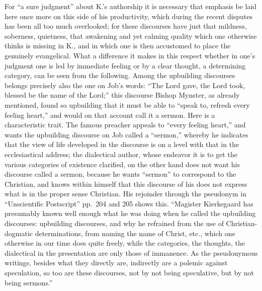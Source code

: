 \documentclass[12pt,a4paper]{article}
\newcommand{\opage}[1]{\marginnote{\footnotesize\textit{[#1]}}}
\begin{document}
For ``a sure judgment'' about K.'s authorship
it is necessary that emphasis be laid here once more on
this side of his productivity, which during the recent disputes has been all too much
overlooked; for these discourses have
just that mildness, soberness, quietness, that awakening and
yet calming quality which one otherwise thinks is missing in
K., and in which one is then accustomed to place the genuinely evangelical.
What a difference it makes in this respect whether
in one's judgment one is led by immediate feeling or by a
clear thought, a determining category, can be seen
from the following. Among the upbuilding discourses belongs precisely
also the one on Job's words: ``The Lord gave, the Lord took,
blessed be the name of the Lord;'' this discourse Bishop
Mynster, as already mentioned, found so upbuilding that it
must be able to ``speak to, refresh every feeling heart,''
and would on that account call it a sermon. Here
\opage{10}
is a characteristic trait. The famous preacher appeals
to ``every feeling heart,'' and wants the
upbuilding discourse on Job called a ``sermon,'' whereby
he indicates that the view of life developed in the discourse
is on a level with that in the ecclesiastical address;
the dialectical author, whose endeavor it is to get
the various categories of existence clarified, on the other hand
does not want his discourse called a sermon, because he
wants ``sermon'' to correspond to the Christian, and knows
within himself that this discourse of his does not express what is in
the proper sense Christian. His rejoinder through
the pseudonym in ``Unscientific Postscript'' pp.\ 204 and
205 shows this. ``Magister Kierkegaard has presumably known well enough
what he was doing when he called the upbuilding
discourses: upbuilding discourses, and why he refrained
from the use of Christian-dogmatic determinations, from
naming the name of Christ, etc., which one otherwise in our time
does quite freely, while the categories, the thoughts, the dialectical
in the presentation are only those of immanence. As the
pseudonymous writings, besides what they directly are, indirectly
are a polemic against speculation, so too are
these discourses, not by not being speculative,
but by not being sermons.''
\end{document}
